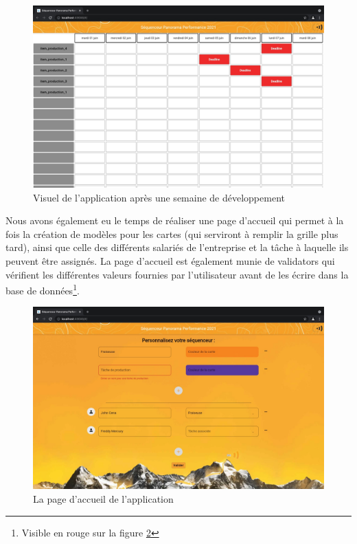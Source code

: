 \clearpage


\begin{figure}[!h]
    \centering
    \includegraphics[scale=0.28]{img/app_v1.jpeg}
    \caption{Visuel de l'application après une semaine de développement}
    \label{fig:appV1}
\end{figure}

Nous avons également eu le temps de réaliser une page d'accueil qui permet à la fois la création de modèles pour les cartes (qui serviront à remplir la grille plus tard), ainsi que celle des différents salariés de l'entreprise et la tâche à laquelle ils peuvent être assignés. La page d'accueil est également munie de validators qui vérifient les différentes valeurs fournies par l'utilisateur avant de les écrire dans la base de données\footnote{Visible en rouge sur la figure \ref{fig:appV1StartPage}}.

\begin{figure}[!h]
    \centering
    \includegraphics[scale=0.28]{img/app_v1_startPage.jpeg}
    \caption{La page d'accueil de l'application}
    \label{fig:appV1StartPage}
\end{figure}
\clearpage

